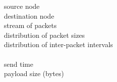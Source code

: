 \hspace*{1ex}\raisebox{1.5pt}{$\centerdot$}~source node\\
\hspace*{1ex}\raisebox{1.5pt}{$\centerdot$}~destination node\\
\hspace*{1ex}\raisebox{1.5pt}{$\centerdot$}~stream of packets\\
\hspace*{1ex}\raisebox{1.5pt}{$\centerdot$}~distribution of packet sizes\\
\hspace*{1ex}\raisebox{1.5pt}{$\centerdot$}~distribution of inter-packet intervals\\
[3pt]
\textbf{}\\
\hspace*{1ex}\raisebox{1.5pt}{$\centerdot$}~send time\\
\hspace*{1ex}\raisebox{1.5pt}{$\centerdot$}~payload size (bytes)\\
